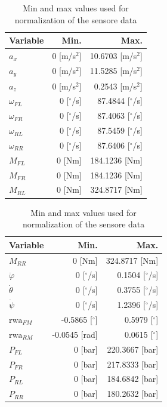 \FloatBarrier
\begin{table}[htbp]
\centering
\small
\setlength{\tabcolsep}{6pt}

\begin{minipage}{0.48\textwidth}
\centering
\begin{tabular}{lrr}
\toprule
\textbf{Variable} & \textbf{Min.} & \textbf{Max.} \\
\midrule
$a_x$        & 0 [m/s$^2$] & 10.6703 [m/s$^2$] \\
$a_y$        & 0 [m/s$^2$] & 11.5285 [m/s$^2$] \\
$a_z$        & 0 [m/s$^2$] & 0.2543 [m/s$^2$] \\
$\omega_{FL}$& 0 [$^\circ$/s] & 87.4844 [$^\circ$/s] \\
$\omega_{FR}$& 0 [$^\circ$/s] & 87.4063 [$^\circ$/s] \\
$\omega_{RL}$& 0 [$^\circ$/s] & 87.5459 [$^\circ$/s] \\
$\omega_{RR}$& 0 [$^\circ$/s] & 87.6406 [$^\circ$/s] \\
$M_{FL}$     & 0 [Nm] & 184.1236 [Nm] \\
$M_{FR}$     & 0 [Nm] & 184.1236 [Nm] \\
$M_{RL}$     & 0 [Nm] & 324.8717 [Nm] \\
\bottomrule
\end{tabular}
\end{minipage}
\hfill
\begin{minipage}{0.48\textwidth}
\centering
\begin{tabular}{lrr}
\toprule
\textbf{Variable} & \textbf{Min.} & \textbf{Max.} \\
\midrule
$M_{RR}$     & 0 [Nm] & 324.8717 [Nm] \\
$\dot\varphi$ & 0 [$^\circ$/s] & 0.1504 [$^\circ$/s] \\
$\dot\theta$  & 0 [$^\circ$/s] & 0.3755 [$^\circ$/s] \\
$\dot\psi$ & 0 [$^\circ$/s] & 1.2396 [$^\circ$/s] \\
$\text{rwa}_{FM}$ & -0.5865 [$^\circ$] & 0.5979 [$^\circ$] \\
$\text{rwa}_{RM}$ & -0.0545 [rad] & 0.0615 [$^\circ$] \\
$P_{FL}$     & 0 [bar] & 220.3667 [bar] \\
$P_{FR}$     & 0 [bar] & 217.8333 [bar] \\
$P_{RL}$     & 0 [bar] & 184.6842 [bar] \\
$P_{RR}$     & 0 [bar] & 180.2632 [bar] \\
\bottomrule
\end{tabular}
\end{minipage}

\caption{Min and max values used for normalization of the sensore data}
\label{tab:normalization_values}
\end{table}
\FloatBarrier

